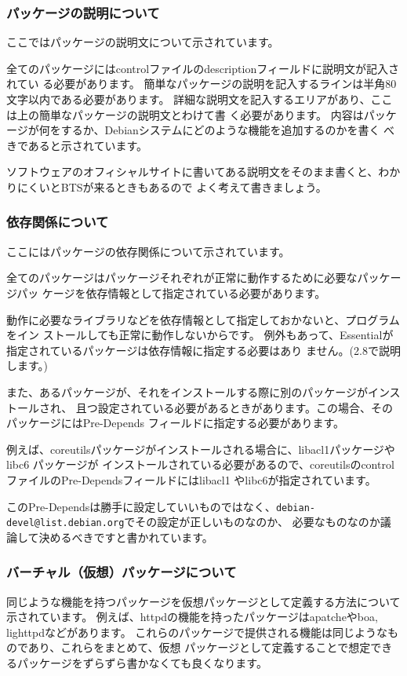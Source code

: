 \documentclass[mingoth,a4paper]{jsarticle}
\begin{document}
\subsubsection{パッケージの説明について}
ここではパッケージの説明文について示されています。


全てのパッケージにはcontrolファイルのdescriptionフィールドに説明文が記入されてい
る必要があります。
簡単なパッケージの説明を記入するラインは半角80文字以内である必要があります。
詳細な説明文を記入するエリアがあり、ここは上の簡単なパッケージの説明文とわけて書
く必要があります。
内容はパッケージが何をするか、Debianシステムにどのような機能を追加するのかを書く
べきであると示されています。


ソフトウェアのオフィシャルサイトに書いてある説明文をそのまま書くと、わかりにくいとBTSが来るときもあるので
よく考えて書きましょう。

\subsubsection{依存関係について}
ここにはパッケージの依存関係について示されています。

全てのパッケージはパッケージそれぞれが正常に動作するために必要なパッケージパッ
ケージを依存情報として指定されている必要があります。


動作に必要なライブラリなどを依存情報として指定しておかないと、プログラムをイン
ストールしても正常に動作しないからです。
例外もあって、Essentialが指定されているパッケージは依存情報に指定する必要はあり
ません。(2.8で説明します。)


また、あるパッケージが、それをインストールする際に別のパッケージがインストールされ、
且つ設定されている必要があるときがあります。この場合、そのパッケージにはPre-Depends
フィールドに指定する必要があります。


例えば、coreutilsパッケージがインストールされる場合に、libacl1パッケージやlibc6 パッケージが
インストールされている必要があるので、coreutilsのcontrolファイルのPre-Dependsフィールドにはlibacl1
やlibc6が指定されています。


このPre-Dependsは勝手に設定していいものではなく、{\tt debian-devel@list.debian.org}でその設定が正しいものなのか、
必要なものなのか議論して決めるべきですと書かれています。


\subsubsection{バーチャル（仮想）パッケージについて}
同じような機能を持つパッケージを仮想パッケージとして定義する方法について示されています。
例えば、httpdの機能を持ったパッケージはapatcheやboa, lighttpdなどがあります。
これらのパッケージで提供される機能は同じようなものであり、これらをまとめて、仮想
パッケージとして定義することで想定できるパッケージをずらずら書かなくても良くなります。
\end{document}
